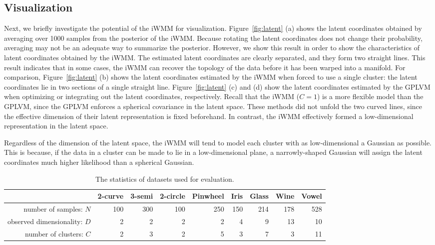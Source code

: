 \subsection{Visualization}
Next, we briefly investigate the potential of the iWMM for visualization.  Figure~\ref{fig:latent} (a) shows the latent coordinates obtained by averaging over 1000 samples from the posterior of the iWMM.
Because rotating the latent coordinates does not change their probability, averaging may not be an adequate way to summarize the posterior.
However, we show this result in order to 
show the characteristics of latent coordinates obtained by the iWMM.
The estimated latent coordinates are clearly separated, and they form two straight lines.
This result indicates that in some cases, the iWMM can recover the topology of the data before it has been warped into a manifold.
For comparison, Figure~\ref{fig:latent} (b) shows the latent coordinates 
estimated by the iWMM when forced to use a single cluster: the latent coordinates lie in two sections of a single straight line.
Figure~\ref{fig:latent} (c) and (d) show the latent coordinates 
estimated by the GPLVM when optimizing or integrating out the latent coordinates, respectively.  
Recall that the iWMM ($C=1$) is a more flexible model than the GPLVM, since the GPLVM enforces a spherical covariance in the latent space.
These methods did not unfold the two curved lines, since the effective dimension of their latent representation is fixed beforehand.
In contrast, the iWMM effectively formed a low-dimensional representation in the latent space. 

Regardless of the dimension of the latent space, the iWMM will tend to model each cluster with as low-dimensional a Gaussian as possible. 
This is because, if the data in a cluster can be made to lie in a low-dimensional plane, a narrowly-shaped Gaussian will assign the latent coordinates much higher likelihood than a spherical Gaussian.

\begin{table*}[ht!]
\centering
\caption{The statistics of datasets used for evaluation.}
\label{tab:statistics}
\begin{tabular}{rrrrrrrrr}
\hline
 & 2-curve & 3-semi & 2-circle & Pinwheel & Iris  & Glass  & Wine  & Vowel  \\
\hline
number of samples: $N$ & 100 & 300 & 100 & 250 & 150 & 214 & 178 & 528 \\
observed dimensionality: $D$ & 2 & 2 & 2 & 2 & 4 & 9 & 13 & 10 \\
number of clusters: $C$ & 2 & 3 & 2 & 5 & 3 & 7 & 3 & 11 \\
\hline
\end{tabular}
\end{table*}

